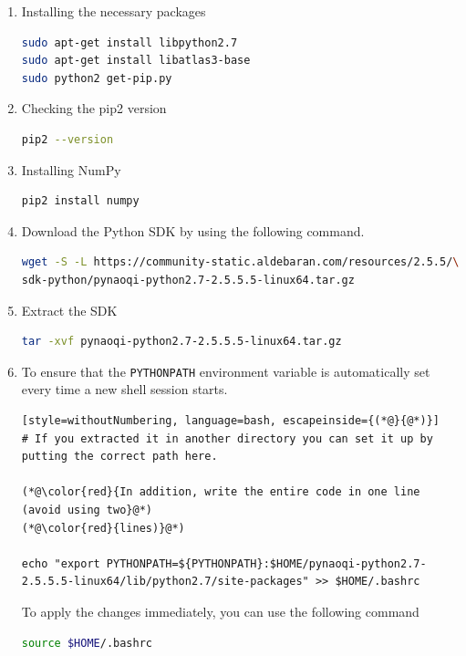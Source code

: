 \documentclass{CSSRforAfrica}
\begin{document}
{{\begin{enumerate}
\item Installing the necessary packages

\begin{lstlisting}[style=withoutNumbering, language=bash]
sudo apt-get install libpython2.7
sudo apt-get install libatlas3-base 
sudo python2 get-pip.py
\end{lstlisting}

\item Checking the pip2 version
\begin{lstlisting}[style=withoutNumbering, language=bash]
pip2 --version
\end{lstlisting}

\item Installing NumPy
\begin{lstlisting}[style=withoutNumbering, language=bash]
pip2 install numpy
\end{lstlisting}

\item Download the Python SDK by using the following command. 
\begin{lstlisting}[style=withoutNumbering, language=bash]
wget -S -L https://community-static.aldebaran.com/resources/2.5.5/\
sdk-python/pynaoqi-python2.7-2.5.5.5-linux64.tar.gz
\end{lstlisting}

\item Extract the SDK
\begin{lstlisting}[style=withoutNumbering, language=bash]
tar -xvf pynaoqi-python2.7-2.5.5.5-linux64.tar.gz
\end{lstlisting}

\newpage

\item To ensure that the \texttt{PYTHONPATH} environment variable is automatically set every time a new shell session starts. 

\begin{lstlisting}[style=withoutNumbering, language=bash, escapeinside={(*@}{@*)}]
# If you extracted it in another directory you can set it up by putting the correct path here. 

(*@\color{red}{In addition, write the entire code in one line (avoid using two}@*)
(*@\color{red}{lines)}@*)

echo "export PYTHONPATH=${PYTHONPATH}:$HOME/pynaoqi-python2.7-2.5.5.5-linux64/lib/python2.7/site-packages" >> $HOME/.bashrc
\end{lstlisting}


To apply the changes immediately, you can use the following command 
\begin{lstlisting}[style=withoutNumbering, language=bash]
source $HOME/.bashrc
\end{lstlisting}
\end{enumerate}
}
}
\end{document}
